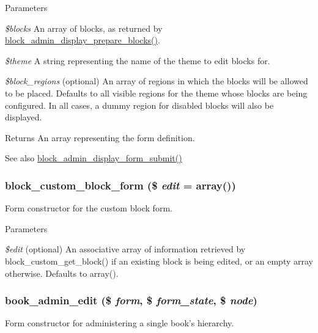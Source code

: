 \begin{DoxyParams}{Parameters}
\item[{\em \$blocks}]An array of blocks, as returned by \hyperlink{block_8admin_8inc_af1b2a0aeb8b76a4bc99d435bf5d08fd1}{block\_\-admin\_\-display\_\-prepare\_\-blocks()}. \item[{\em \$theme}]A string representing the name of the theme to edit blocks for. \item[{\em \$block\_\-regions}](optional) An array of regions in which the blocks will be allowed to be placed. Defaults to all visible regions for the theme whose blocks are being configured. In all cases, a dummy region for disabled blocks will also be displayed.\end{DoxyParams}
\begin{DoxyReturn}{Returns}
An array representing the form definition.
\end{DoxyReturn}
\begin{DoxySeeAlso}{See also}
\hyperlink{block_8admin_8inc_a9a7a5d16e2db34422f490e08d4bda247}{block\_\-admin\_\-display\_\-form\_\-submit()} 
\end{DoxySeeAlso}
\hypertarget{group__forms_ga94f8fff63b59438120a7269f00dad174}{
\subsubsection[{block\_\-custom\_\-block\_\-form}]{\setlength{\rightskip}{0pt plus 5cm}block\_\-custom\_\-block\_\-form (\$ {\em edit} = {\ttfamily array()})}}
\label{group__forms_ga94f8fff63b59438120a7269f00dad174}
Form constructor for the custom block form.


\begin{DoxyParams}{Parameters}
\item[{\em \$edit}](optional) An associative array of information retrieved by block\_\-custom\_\-get\_\-block() if an existing block is being edited, or an empty array otherwise. Defaults to array(). \end{DoxyParams}
\hypertarget{group__forms_gac3a5a2ff41875baa73d6af357cf328e6}{
\subsubsection[{book\_\-admin\_\-edit}]{\setlength{\rightskip}{0pt plus 5cm}book\_\-admin\_\-edit (\$ {\em form}, \/  \$ {\em form\_\-state}, \/  \$ {\em node})}}
\label{group__forms_gac3a5a2ff41875baa73d6af357cf328e6}
Form constructor for administering a single book's hierarchy.


